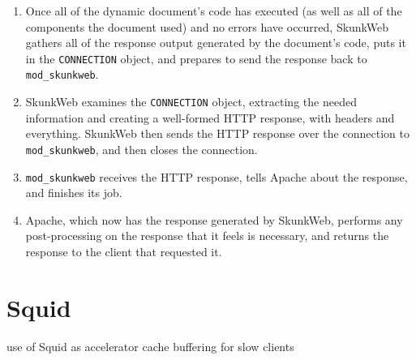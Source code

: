 \documentclass[titlepage]{manual}
\begin{document}
\begin{enumerate}
\item Once all of the dynamic document's code has executed (as well as
all of the components the document used) and no errors have occurred,
SkunkWeb gathers all of the response output generated by the
document's code, puts it in the \texttt{CONNECTION} object, and
prepares to send the response back to \texttt{mod\_skunkweb}.

\item SkunkWeb examines the \texttt{CONNECTION} object, extracting the
needed information and creating a well-formed HTTP response, with
headers and everything. SkunkWeb then sends the HTTP response over the
connection to \texttt{mod\_skunkweb}, and then closes the connection.

\item \texttt{mod\_skunkweb} receives the HTTP response, tells Apache
about the response, and finishes its job.

\item Apache, which now has the response generated by SkunkWeb,
performs any post-processing on the response that it feels is
necessary, and returns the response to the client that requested it.
\end{enumerate}

\section{Squid}
  use of Squid as accelerator cache 
    buffering for slow clients


\cleardoublepage %
\printindex
\end{document}

